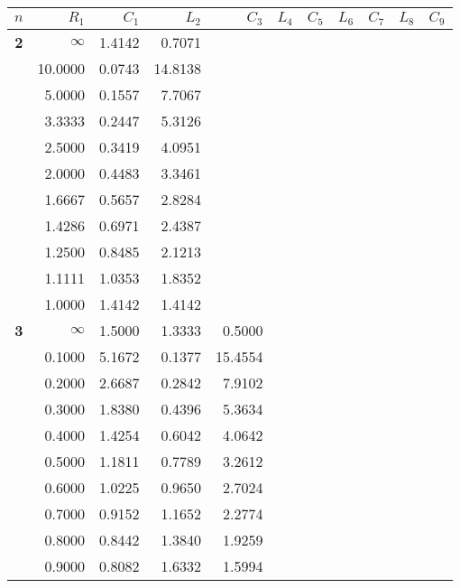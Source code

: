 \clearpage~~\vspace*{-13mm}
\begin{table}[!htb]
\begin{center}
{\tiny
\begin{tabular}{|c||r|r|r|r|r|r|r|r|r|r|}\hline
$n$ & $R_1$   & $C_1$ & $L_2$ & $C_3$ & $L_4$ & $C_5$ & $L_6$ & $C_7$ & $L_8$ & $C_9$\\ \hline\hline
\textbf{ 2}&$\infty$&1.4142&0.7071&     &     &     &     &     &     &     \\
&10.0000&0.0743&14.8138&     &     &     &     &     &     &     \\
&5.0000&0.1557&7.7067&     &     &     &     &     &     &     \\
&3.3333&0.2447&5.3126&     &     &     &     &     &     &     \\
&2.5000&0.3419&4.0951&     &     &     &     &     &     &     \\
&2.0000&0.4483&3.3461&     &     &     &     &     &     &     \\
&1.6667&0.5657&2.8284&     &     &     &     &     &     &     \\
&1.4286&0.6971&2.4387&     &     &     &     &     &     &     \\
&1.2500&0.8485&2.1213&     &     &     &     &     &     &     \\
&1.1111&1.0353&1.8352&     &     &     &     &     &     &     \\
&1.0000&1.4142&1.4142&     &     &     &     &     &     &     \\ \hline
\textbf{ 3}&$\infty$&1.5000&1.3333&0.5000&     &     &     &     &     &     \\
&0.1000&5.1672&0.1377&15.4554&     &     &     &     &     &     \\
&0.2000&2.6687&0.2842&7.9102&     &     &     &     &     &     \\
&0.3000&1.8380&0.4396&5.3634&     &     &     &     &     &     \\
&0.4000&1.4254&0.6042&4.0642&     &     &     &     &     &     \\
&0.5000&1.1811&0.7789&3.2612&     &     &     &     &     &     \\
&0.6000&1.0225&0.9650&2.7024&     &     &     &     &     &     \\
&0.7000&0.9152&1.1652&2.2774&     &     &     &     &     &     \\
&0.8000&0.8442&1.3840&1.9259&     &     &     &     &     &     \\
&0.9000&0.8082&1.6332&1.5994&     &     &     &     &     &     \\

\end{tabular}}
\end{center}
\end{table}
